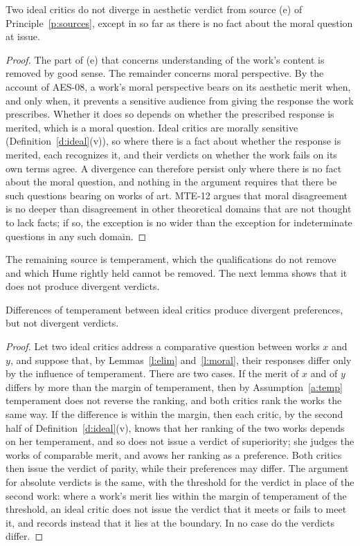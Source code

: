 \documentclass{situationist-preprint}
\begin{document}
\begin{lemma}\label{l:moral}
Two ideal critics do not diverge in aesthetic verdict from source (e) of Principle~\ref{p:sources}, except in so far as there is no fact about the moral question at issue.
\end{lemma}

\begin{proof}
The part of (e) that concerns understanding of the work's content is removed by good sense. The remainder concerns moral perspective. By the account of AES-08, a work's moral perspective bears on its aesthetic merit when, and only when, it prevents a sensitive audience from giving the response the work prescribes. Whether it does so depends on whether the prescribed response is merited, which is a moral question. Ideal critics are morally sensitive (Definition~\ref{d:ideal}(v)), so where there is a fact about whether the response is merited, each recognizes it, and their verdicts on whether the work fails on its own terms agree. A divergence can therefore persist only where there is no fact about the moral question, and nothing in the argument requires that there be such questions bearing on works of art. MTE-12 argues that moral disagreement is no deeper than disagreement in other theoretical domains that are not thought to lack facts; if so, the exception is no wider than the exception for indeterminate questions in any such domain.
\end{proof}

The remaining source is temperament, which the qualifications do not remove and which Hume rightly held cannot be removed. The next lemma shows that it does not produce divergent verdicts.

\begin{lemma}[Temperament]\label{l:temp}
Differences of temperament between ideal critics produce divergent preferences, but not divergent verdicts.
\end{lemma}

\begin{proof}
Let two ideal critics address a comparative question between works $x$ and $y$, and suppose that, by Lemmas~\ref{l:elim} and~\ref{l:moral}, their responses differ only by the influence of temperament. There are two cases. If the merit of $x$ and of $y$ differs by more than the margin of temperament, then by Assumption~\ref{a:temp} temperament does not reverse the ranking, and both critics rank the works the same way. If the difference is within the margin, then each critic, by the second half of Definition~\ref{d:ideal}(v), knows that her ranking of the two works depends on her temperament, and so does not issue a verdict of superiority; she judges the works of comparable merit, and avows her ranking as a preference. Both critics then issue the verdict of parity, while their preferences may differ. The argument for absolute verdicts is the same, with the threshold for the verdict in place of the second work: where a work's merit lies within the margin of temperament of the threshold, an ideal critic does not issue the verdict that it meets or fails to meet it, and records instead that it lies at the boundary. In no case do the verdicts differ.
\end{proof}
\end{document}
